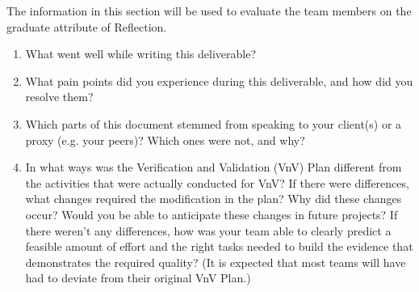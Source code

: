 \documentclass[12pt, titlepage]{article}
\begin{document}
The information in this section will be used to evaluate the team members on the
graduate attribute of Reflection.



\begin{enumerate}
  \item What went well while writing this deliverable?
  \item What pain points did you experience during this deliverable, and how
    did you resolve them?
  \item Which parts of this document stemmed from speaking to your client(s) or
    a proxy (e.g. your peers)? Which ones were not, and why?
  \item In what ways was the Verification and Validation (VnV) Plan different
    from the activities that were actually conducted for VnV?  If there were
    differences, what changes required the modification in the plan?  Why did
    these changes occur?  Would you be able to anticipate these
    changes in future
    projects?  If there weren't any differences, how was your team
    able to clearly
    predict a feasible amount of effort and the right tasks needed to build the
    evidence that demonstrates the required quality?  (It is expected that most
    teams will have had to deviate from their original VnV Plan.)
\end{enumerate}
\end{document}
